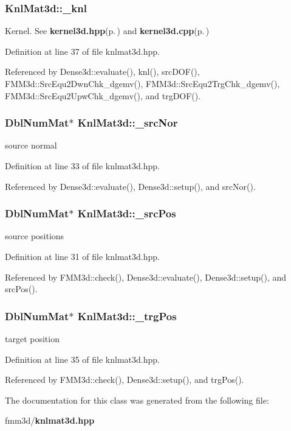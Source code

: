 \subsubsection{ {\bf Knl\-Mat3d::\_\-knl}\hspace{0.3cm}{\tt  [protected]}}\label{classKnlMat3d_cb56a4f532a89bc1a51ee17c2434a106_cb56a4f532a89bc1a51ee17c2434a106}


Kernel. See {\bf kernel3d.hpp}{\rm (p.\,\pageref{kernel3d_8hpp})} and {\bf kernel3d.cpp}{\rm (p.\,\pageref{kernel3d_8cpp})} 

Definition at line 37 of file knlmat3d.hpp.

Referenced by Dense3d::evaluate(), knl(), src\-DOF(), FMM3d::Src\-Equ2Dwn\-Chk\_\-dgemv(), FMM3d::Src\-Equ2Trg\-Chk\_\-dgemv(), FMM3d::Src\-Equ2Upw\-Chk\_\-dgemv(), and trg\-DOF().
\subsubsection{\setlength{\rightskip}{0pt plus 5cm}Dbl\-Num\-Mat$\ast$ {\bf Knl\-Mat3d::\_\-src\-Nor}\hspace{0.3cm}{\tt  [protected]}}\label{classKnlMat3d_bbeec6db21041e1b277f4755f21047dd_bbeec6db21041e1b277f4755f21047dd}


source normal 

Definition at line 33 of file knlmat3d.hpp.

Referenced by Dense3d::evaluate(), Dense3d::setup(), and src\-Nor().
\subsubsection{\setlength{\rightskip}{0pt plus 5cm}Dbl\-Num\-Mat$\ast$ {\bf Knl\-Mat3d::\_\-src\-Pos}\hspace{0.3cm}{\tt  [protected]}}\label{classKnlMat3d_f66b814fdf8eb17df56ff5ff27a368da_f66b814fdf8eb17df56ff5ff27a368da}


source positions 

Definition at line 31 of file knlmat3d.hpp.

Referenced by FMM3d::check(), Dense3d::evaluate(), Dense3d::setup(), and src\-Pos().
\subsubsection{\setlength{\rightskip}{0pt plus 5cm}Dbl\-Num\-Mat$\ast$ {\bf Knl\-Mat3d::\_\-trg\-Pos}\hspace{0.3cm}{\tt  [protected]}}\label{classKnlMat3d_a1b44c7c6fd0a38be167c34537b1a508_a1b44c7c6fd0a38be167c34537b1a508}


target position 

Definition at line 35 of file knlmat3d.hpp.

Referenced by FMM3d::check(), Dense3d::setup(), and trg\-Pos().

The documentation for this class was generated from the following file:\begin{CompactItemize}
\item 
fmm3d/{\bf knlmat3d.hpp}\end{CompactItemize}
